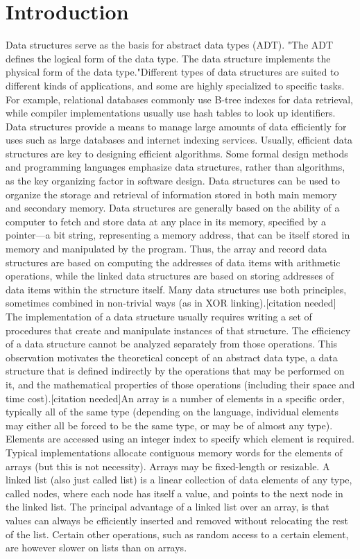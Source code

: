 \documentclass[9pt,twocolumn,twoside,lineno]{gsajnl}
\begin{document}
\section{Introduction}
Data structures serve as the basis for abstract data 
types (ADT). "The ADT defines the logical form of 
the data type. The data structure implements the 
physical form of the data type."Different types of data 
structures are suited to different kinds of applications, 
and some are highly specialized to specific tasks. For 
example, relational databases commonly use B-tree 
indexes for data retrieval, while compiler 
implementations usually use hash tables to look up 
identifiers. Data structures provide a means to manage 
large amounts of data efficiently for uses such as large 
databases and internet indexing services. Usually, 
efficient data structures are key to designing efficient 
algorithms. Some formal design methods and 
programming languages emphasize data structures, 
rather than algorithms, as the key organizing factor in 
software design. Data structures can be used to 
organize the storage and retrieval of information 
stored in both main memory and secondary memory. 
Data structures are generally based on the ability of a 
computer to fetch and store data at any place in its 
memory, specified by a pointer—a bit string, 
representing a memory address, that can be itself 
stored in memory and manipulated by the program. 
Thus, the array and record data structures are based on 
computing the addresses of data items with arithmetic 
operations, while the linked data structures are based 
on storing addresses of data items within the structure 
itself. Many data structures use both principles, 
sometimes combined in non-trivial ways (as in XOR 
linking).[citation needed] 
The implementation of a data structure usually 
requires writing a set of procedures that create and 
manipulate instances of that structure. The efficiency 
of a data structure cannot be analyzed separately from 
those operations. This observation motivates the 
theoretical concept of an abstract data type, a data 
structure that is defined indirectly by the operations 
that may be performed on it, and the mathematical 
properties of those operations (including their space 
and time cost).[citation needed]An array is a number 
of elements in a specific order, typically all of the 
same type (depending on the language, individual 
elements may either all be forced to be the same type, 
or may be of almost any type). Elements are accessed 
using an integer index to specify which element is 
required. Typical implementations allocate contiguous 
memory words for the elements of arrays (but this is 
not necessity). Arrays may be fixed-length or 
resizable. A linked list (also just called list) is a linear 
collection of data elements of any type, called nodes, 
where each node has itself a value, and points to the 
next node in the linked list. The principal advantage 
of a linked list over an array, is that values can always 
be efficiently inserted and removed without relocating 
the rest of the list. Certain other operations, such as 
random access to a certain element, are however 
slower on lists than on arrays.
\end{document}
